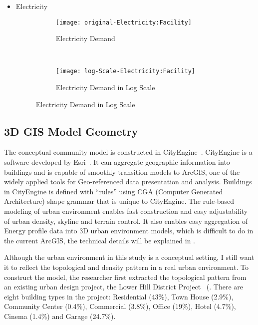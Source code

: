 \begin{itemize}
\pagebreak
\item Electricity
\begin{figure}[h!]
  \centering
  \begin{subfigure}{0.4\textwidth}
  \centering
  \texttt{[image: original-Electricity:Facility]}
  \caption[Electricity  Demand]{Electricity Demand}
  \label{fig:original-Electricity:Facility}
\end{subfigure}
~
\begin{subfigure}{0.4\textwidth}
  \centering
  \texttt{[image: log-Scale-Electricity:Facility]}
  \caption[Electricity  Demand]{Electricity  Demand in Log Scale}
  \label{fig:log-Scale-Electricity:Facility}
\end{subfigure}
  \caption[Electricity  Demand Log]{Electricity Demand in Log Scale}
\end{figure}

\end{itemize}

\pagebreak
\subsection{3D GIS Model Geometry}
The conceptual community model is constructed in
CityEngine~\cite{cityEngine2015}. CityEngine is a software developed
by Esri~\cite{Esri2015}. It can aggregate geographic information into
buildings and is capable of smoothly transition models to
ArcGIS\cite{ArcGIS2015}, one of the widely applied tools for
Geo-referenced data presentation and analysis. Buildings in CityEngine
is defined with ``rules'' using CGA (Computer Generated Architecture)
shape grammar that is unique to CityEngine. The rule-based modeling of
urban environment enables fast construction and easy adjustability of
urban density, skyline and terrain control. It also enables easy
aggregation of Energy profile data into 3D urban environment models,
which is difficult to do in the current ArcGIS, the technical details
will be explained in .

Although the urban environment in this study is a conceptual setting,
I still want it to reflect the topological and density pattern in a
real urban environment. To construct the model, the researcher first extracted the
topological pattern from an existing urban design project, the Lower
Hill District Project~\cite{baird2014} (.  There
are eight building types in the project: Residential (43\%), Town
House (2.9\%), Community Center (0.4\%), Commercial (3.8\%), Office
(19\%), Hotel (4.7\%), Cinema (1.4\%) and Garage (24.7\%).

